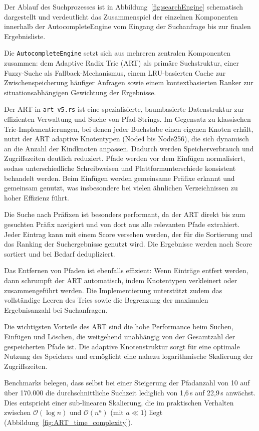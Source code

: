 Der Ablauf des Suchprozesses ist in Abbildung~\ref{fig:searchEngine}
schematisch dargestellt und verdeutlicht das Zusammenspiel der einzelnen Komponenten
innerhalb der AutocompleteEngine vom Eingang der Suchanfrage bis zur finalen Ergebnisliste.

Die \verb|AutocompleteEngine| setzt sich aus mehreren zentralen Komponenten zusammen: dem Adaptive Radix Trie (ART) als primäre Suchstruktur, einer Fuzzy-Suche als Fallback-Mechanismus, einem LRU-basierten Cache zur Zwischenspeicherung häufiger Anfragen sowie einem kontextbasierten Ranker zur situationsabhängigen Gewichtung der Ergebnisse.

Der ART in \verb|art_v5.rs| ist eine spezialisierte, baumbasierte Datenstruktur zur effizienten Verwaltung und Suche von Pfad-Strings.
Im Gegensatz zu klassischen Trie-Implementierungen, bei denen jeder Buchstabe einen eigenen Knoten erhält, nutzt der ART adaptive Knotentypen (Node4 bis Node256),
die sich dynamisch an die Anzahl der Kindknoten anpassen.
Dadurch werden Speicherverbrauch und Zugriffszeiten deutlich reduziert.
Pfade werden vor dem Einfügen normalisiert, sodass unterschiedliche Schreibweisen und Plattformunterschiede konsistent behandelt werden.
Beim Einfügen werden gemeinsame Präfixe erkannt und gemeinsam genutzt,
was insbesondere bei vielen ähnlichen Verzeichnissen zu hoher Effizienz führt.

Die Suche nach Präfixen ist besonders performant, da der ART direkt bis zum gesuchten Präfix navigiert
und von dort aus alle relevanten Pfade extrahiert.
Jeder Eintrag kann mit einem Score versehen werden, der für die Sortierung und das Ranking der Suchergebnisse genutzt wird.
Die Ergebnisse werden nach Score sortiert und bei Bedarf dedupliziert.

Das Entfernen von Pfaden ist ebenfalls effizient: Wenn Einträge entfert werden, dann schrumpft der ART automatisch, indem Knotentypen verkleinert oder zusammengeführt werden.
Die Implementierung unterstützt zudem das vollständige Leeren des Tries
sowie die Begrenzung der maximalen Ergebnisanzahl bei Suchanfragen.

Die wichtigsten Vorteile des ART sind die hohe Performance beim Suchen, Einfügen und Löschen,
die weitgehend unabhängig von der Gesamtzahl der gespeicherten Pfade ist.
Die adaptive Knotenstruktur sorgt für eine optimale Nutzung des Speichers
und ermöglicht eine nahezu logarithmische Skalierung der Zugriffszeiten.

Benchmarks belegen, dass selbst bei einer Steigerung der Pfadanzahl von 10 auf über 170.000
die durchschnittliche Suchzeit lediglich von 1{,}6\,\textmu s auf 22{,}9\,\textmu s anwächst.
Dies entspricht einer sub-linearen Skalierung,
die im praktischen Verhalten zwischen $\mathcal{O}(\log n)$ und $\mathcal{O}(n^a)$ (mit $a \ll 1$) liegt (Abbildung~\ref{fig:ART_time_complexity}).

